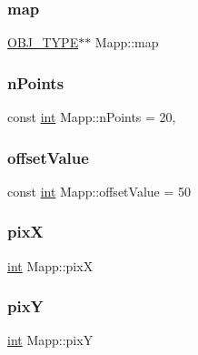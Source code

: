 \subsubsection{\texorpdfstring{map}{map}}
{\footnotesize\ttfamily \mbox{\hyperlink{map_8hh_a714b9c2c276fbae637fee36453d9121e}{O\+B\+J\+\_\+\+T\+Y\+PE}}$\ast$$\ast$ Mapp\+::map\hspace{0.3cm}{\ttfamily [protected]}}

\mbox{\label{class_mapp_addd9fcc5e7db2c40038ab32ecf29171c}} 
\subsubsection{\texorpdfstring{nPoints}{nPoints}}
{\footnotesize\ttfamily const \mbox{\hyperlink{draw_8hh_aa620a13339ac3a1177c86edc549fda9b}{int}} Mapp\+::n\+Points = 20\hspace{0.3cm}{\ttfamily [static]}, {\ttfamily [protected]}}

\mbox{\label{class_mapp_a7a9008b7100b25833c4aff1753dc8eec}} 
\subsubsection{\texorpdfstring{offsetValue}{offsetValue}}
{\footnotesize\ttfamily const \mbox{\hyperlink{draw_8hh_aa620a13339ac3a1177c86edc549fda9b}{int}} Mapp\+::offset\+Value = 50\hspace{0.3cm}{\ttfamily [protected]}}

\mbox{\label{class_mapp_a0d751ee7f6aacc352c1ffb1bf95c21af}} 
\subsubsection{\texorpdfstring{pixX}{pixX}}
{\footnotesize\ttfamily \mbox{\hyperlink{draw_8hh_aa620a13339ac3a1177c86edc549fda9b}{int}} Mapp\+::pixX\hspace{0.3cm}{\ttfamily [protected]}}

\mbox{\label{class_mapp_a756d60b3d694342b7c75621c8559c00e}} 
\subsubsection{\texorpdfstring{pixY}{pixY}}
{\footnotesize\ttfamily \mbox{\hyperlink{draw_8hh_aa620a13339ac3a1177c86edc549fda9b}{int}} Mapp\+::pixY\hspace{0.3cm}{\ttfamily [protected]}}

